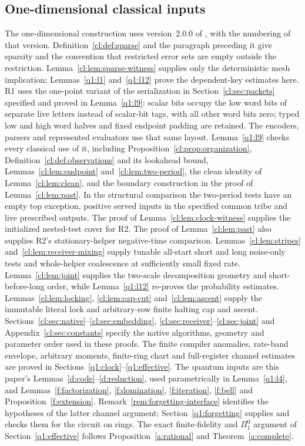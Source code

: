 \subsection{One-dimensional classical inputs}\label{app:imports-1d}
The one-dimensional construction uses version~2.0.0 of
\cite{DMNoise1D2026}, with the numbering of that version.
Definition~\ref*{cl:def:sparse} and the paragraph preceding it give sparsity and
the convention that restricted error sets are empty outside the restriction.
Lemma~\ref*{cl:lem:sparse-witness} supplies only the deterministic mesh
implication; Lemmas~\ref{q1:l1} and~\ref{q1:l12} prove the dependent-key
estimates here. R1 uses the one-point variant of the serialization in
Section~\ref*{cl:sec:packets} specified and proved in
Lemma~\ref{q1:l9}: scalar bits occupy the low word bits of separate
live letters instead of scalar-bit tags, with all other word bits zero;
typed low and high word halves and fixed endpoint padding are retained.
The encoders, parsers and represented evaluators use that same layout.
Lemma~\ref{q1:l9} checks every classical use of it, including
Proposition~\ref*{cl:prop:organization},
Definition~\ref*{cl:def:observations} and its lookahead bound,
Lemmas~\ref*{cl:lem:endpoint} and~\ref*{cl:lem:two-period},
the clean identity of Lemma~\ref*{cl:lem:clean}, and the boundary
construction in the proof of Lemma~\ref*{cl:lem:past}.
In the structural comparison the two-period tests have an empty top
exception, positive served inputs in the specified common tribe and
live prescribed outputs. The proof of
Lemma~\ref*{cl:lem:clock-witness} supplies the initialized nested-test
cover for R2. The proof of Lemma~\ref*{cl:lem:past} also supplies R2's
stationary-helper negative-time comparison.
Lemmas~\ref*{cl:lem:stripes} and~\ref*{cl:lem:receiver-mixing} supply
tunable all-start short and long noise-only tests and whole-helper
coalescence at sufficiently small fixed rate.
Lemma~\ref*{cl:lem:joint} supplies the two-scale decomposition geometry
and short-before-long order, while Lemma~\ref{q1:l12} re-proves the
probability estimates. Lemmas~\ref*{cl:lem:locking},
\ref*{cl:lem:cap-cut} and~\ref*{cl:lem:ascent} supply the immutable
literal lock and arbitrary-row finite halting cap and ascent.
Sections~\ref*{cl:sec:native}--\ref*{cl:sec:embedding},
\ref*{cl:sec:receiver}--\ref*{cl:sec:joint} and
Appendix~\ref*{cl:sec:constants} specify the native algorithms,
geometry and parameter order used in these proofs. The finite compiler
anomalies, rate-band envelope, arbitrary moments, finite-ring chart
and full-register channel estimates are proved in
Sections~\ref{q1:clock}--\ref{q1:effective}.
The quantum inputs are this paper's Lemmas~\ref{d:code}--\ref{d:reduction}, used parametrically in Lemma~\ref{q1:l4}, and Lemmas~\ref{f:factorization}, \ref{f:domination}, \ref{f:iteration}, \ref{f:bell} and Proposition~\ref{f:extension}. Remark~\ref{rem:forgetting-interface} identifies the hypotheses of the latter channel argument; Section~\ref{q1:forgetting} supplies and checks them for the circuit on rings. The exact finite-fidelity and \(\Pi^0_1\) argument of Section~\ref{q1:effective} follows Proposition~\ref{a:rational} and Theorem~\ref{a:complete}.
